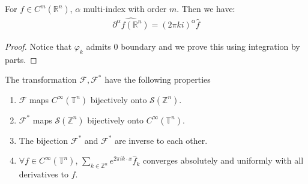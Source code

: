 \begin{lemma}
	For $f \in C^m(\mathbb{R}^n)$, $\alpha$ multi-index with order $m$. Then we have:
	\begin{align*}
		\widehat{\partial^\alpha f (\mathbb{R}^n)} = (2\pi ki)^{\alpha} \widehat{f}
	\end{align*}
\end{lemma}
\begin{proof}
	Notice that $\varphi_k$ admits 0 boundary and we prove this using integration by parts.
\end{proof}

\begin{theorem}
	The transformation $\mathcal{F}, \mathcal{F}^*$ have the following properties
	\begin{enumerate}
		\item $\mathcal{F}$ maps $C^\infty(\mathbb{T}^n)$ bijectively onto $\mathcal{S}(\mathbb{Z}^n)$.
		\item $\mathcal{F}^*$ maps $\mathcal{S}(\mathbb{Z}^n)$  bijectively onto $C^\infty(\mathbb{T}^n)$.
		\item The bijection $\mathcal{F}^*$ and $\mathcal{F}^*$ are inverse to each other.
		\item $\forall f \in C^\infty(\mathbb{T}^n)$, $\sum_{k \in \mathbb{Z}^n} e^{2\pi i k \cdot x} \hat{f}_k$ converges absolutely and uniformly with all derivatives to $f$.
	\end{enumerate}
\end{theorem}
